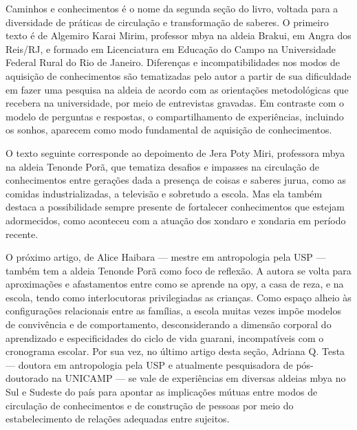 \documentclass{article}
\begin{document}
Caminhos e conhecimentos \'e o nome da segunda se\c{c}\~ao do livro,
voltada para a diversidade de pr\'aticas de circula\c{c}\~ao e
transforma\c{c}\~ao de saberes. O primeiro texto \'e de Algemiro Karai
Mirim, professor mbya na aldeia Brakui, em Angra dos Reis/RJ, e formado
em Licenciatura em Educa\c{c}\~ao do Campo na Universidade Federal
Rural do Rio de Janeiro. Diferen\c{c}as e incompatibilidades nos modos
de aquisi\c{c}\~ao de conhecimentos s\~ao tematizadas pelo autor a
partir de sua dificuldade em fazer uma pesquisa na aldeia de acordo com
as orienta\c{c}\~oes metodol\'ogicas que recebera na universidade, por
meio de entrevistas gravadas. Em contraste com o modelo de perguntas e
respostas, o compartilhamento de experi\^encias, incluindo os sonhos,
aparecem como modo fundamental de aquisi\c{c}\~ao de conhecimentos. 

O texto seguinte corresponde ao depoimento de Jera Poty Miri, professora
mbya na aldeia Tenonde Por\~a, que tematiza desafios e impasses na
circula\c{c}\~ao de conhecimentos entre gera\c{c}\~oes dada a
presen\c{c}a de coisas e saberes jurua, como as comidas
industrializadas, a televis\~ao e sobretudo a escola. Mas ela tamb\'em
destaca a possibilidade sempre presente de fortalecer conhecimentos que
estejam adormecidos, como aconteceu com a atua\c{c}\~ao dos xondaro e
xondaria em per\'iodo recente. 

O pr\'oximo artigo, de Alice Haibara --- mestre em antropologia pela USP
--- tamb\'em tem a aldeia Tenonde Por\~a como foco de reflex\~ao. A
autora se volta para aproxima\c{c}\~oes e afastamentos entre como se
aprende na opy, a casa de reza, e na escola, tendo como interlocutoras
privilegiadas as crian\c{c}as. Como espa\c{c}o alheio \`as
configura\c{c}\~oes relacionais entre as fam\'ilias, a escola muitas
vezes imp\~oe modelos de conviv\^encia e de comportamento,
desconsiderando a dimens\~ao corporal do aprendizado e especificidades
do ciclo de vida guarani, incompat\'iveis com o cronograma escolar. Por
sua vez, no \'ultimo artigo desta se\c{c}\~ao, Adriana Q. Testa ---
doutora em antropologia pela USP e atualmente pesquisadora de
p\'os-doutorado na UNICAMP --- se vale de experi\^encias em diversas
aldeias mbya no Sul e Sudeste do pa\'is para apontar as
implica\c{c}\~oes m\'utuas entre modos de circula\c{c}\~ao de
conhecimentos e de constru\c{c}\~ao de pessoas por meio do
estabelecimento de rela\c{c}\~oes adequadas entre sujeitos. 
\end{document}
